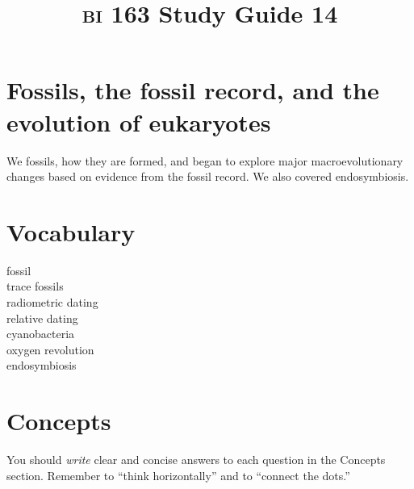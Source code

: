 \documentclass[letterpaper]{tufte-handout}
\title{{\scshape bi} 163 Study Guide 14}
\date{} %
\begin{document}
\maketitle	%

\section*{Fossils, the fossil record, and the evolution of eukaryotes }

We fossils, how they are formed, and began to explore major macroevolutionary changes based on evidence from the fossil record. We also covered endosymbiosis.

\section*{Vocabulary}

\vspace{-1\baselineskip}
\begin{multicols}{2}
fossil\\
trace fossils \\
radiometric dating \\
relative dating \\
cyanobacteria \\
oxygen revolution \\
endosymbiosis
\end{multicols}

\section*{Concepts}

You should \emph{write} clear and concise answers to each question in the Concepts section.  Remember to ``think horizontally'' and to ``connect the dots.'' 
\end{document}
